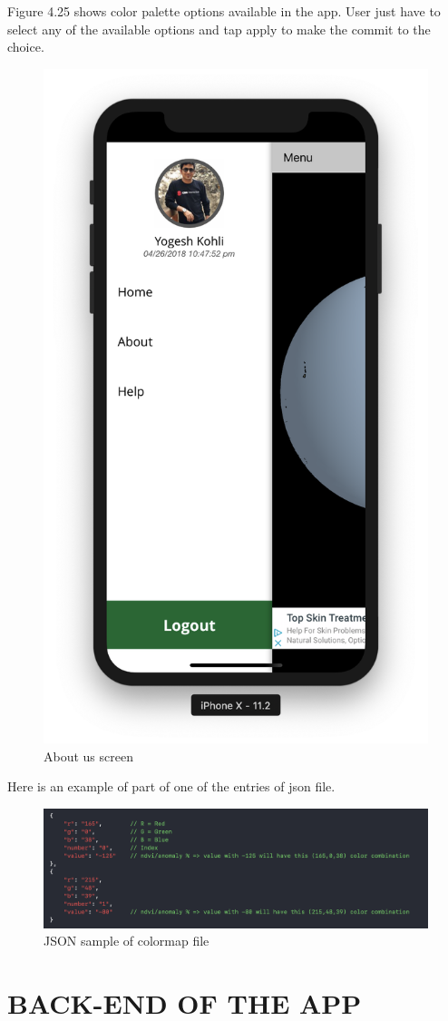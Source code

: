 \begin{itemize}
    Figure 4.25 shows color palette options available in the app. User just have to select any of the available options and tap apply to make the commit to the choice.
    
     \begin{figure}[H]
            \centering
            \includegraphics[width=0.35\linewidth]{figures/ch2/side_menu.png}
            \caption{\label{fig:pass_recovery_1} About us screen}
    \end{figure}
        
    Here is an example of part of one of the entries of \gls{json} file.
    
    \begin{figure}[H]
            \centering
            \includegraphics[width=1.0\linewidth]{figures/ch4/color_map_final.png}
            \caption{\label{fig:color_json} JSON sample of colormap file}
    \end{figure}

    \newpage
    
\end{itemize}



\section{BACK-END OF THE APP}


